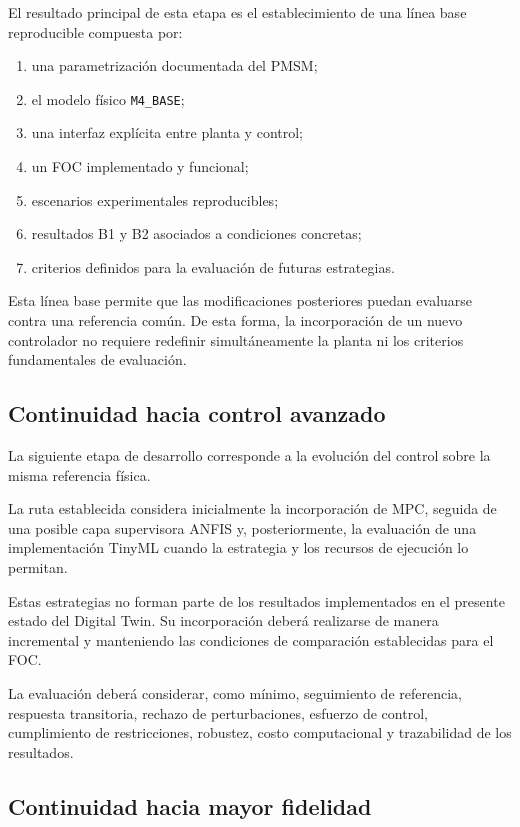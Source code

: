 El resultado principal de esta etapa es el establecimiento de una línea base reproducible compuesta por:

\begin{enumerate}
\item una parametrización documentada del PMSM;
\item el modelo físico \texttt{M4\_BASE};
\item una interfaz explícita entre planta y control;
\item un FOC implementado y funcional;
\item escenarios experimentales reproducibles;
\item resultados B1 y B2 asociados a condiciones concretas;
\item criterios definidos para la evaluación de futuras estrategias.
\end{enumerate}

Esta línea base permite que las modificaciones posteriores puedan evaluarse contra una referencia común. De esta forma, la incorporación de un nuevo controlador no requiere redefinir simultáneamente la planta ni los criterios fundamentales de evaluación.

\subsection{Continuidad hacia control avanzado}

La siguiente etapa de desarrollo corresponde a la evolución del control sobre la misma referencia física.

La ruta establecida considera inicialmente la incorporación de MPC, seguida de una posible capa supervisora ANFIS y, posteriormente, la evaluación de una implementación TinyML cuando la estrategia y los recursos de ejecución lo permitan.

Estas estrategias no forman parte de los resultados implementados en el presente estado del Digital Twin. Su incorporación deberá realizarse de manera incremental y manteniendo las condiciones de comparación establecidas para el FOC.

La evaluación deberá considerar, como mínimo, seguimiento de referencia, respuesta transitoria, rechazo de perturbaciones, esfuerzo de control, cumplimiento de restricciones, robustez, costo computacional y trazabilidad de los resultados.

\subsection{Continuidad hacia mayor fidelidad}

